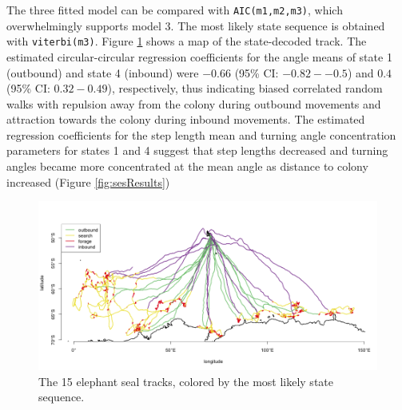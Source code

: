 \documentclass[12pt]{article}\usepackage[]{graphicx}\usepackage[]{color}
\begin{document}
The three fitted model can be compared with \verb|AIC(m1,m2,m3)|, which overwhelmingly supports model 3. The most likely state sequence is obtained with \verb|viterbi(m3)|. Figure \ref{fig:sesTracks} shows a map of the state-decoded track. The estimated circular-circular regression coefficients for the angle means of state 1 (outbound) and state 4 (inbound) were $-0.66$ (95\% CI: $-0.82--0.5$) and $0.4$ (95\% CI: $0.32-0.49$), respectively, thus indicating biased correlated random walks with repulsion away from the colony during outbound movements and attraction towards the colony during inbound movements. The estimated regression coefficients for the step length mean and turning angle concentration parameters for states 1 and 4 suggest that step lengths decreased and turning angles became more concentrated at the mean angle as distance to colony increased (Figure \ref{fig:sesResults})

\begin{figure}[htbp]
  \centering
  \includegraphics[width=\textwidth]{plot_sesResults2.png}
  \caption{The 15 elephant seal tracks, colored by the most likely state sequence.}
  \label{fig:sesTracks}
\end{figure}
\end{document}
